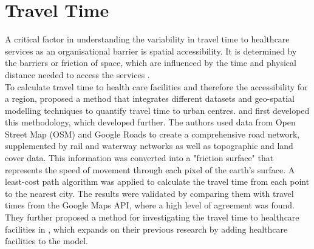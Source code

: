 \documentclass[11pt, a4paper]{report}
\begin{document}
\section{Travel Time}\label{sec:introtraveltime}
A critical factor in understanding the variability in travel time to healthcare services as an organisational barrier is spatial accessibility. It is determined by the barriers or friction of space, which are influenced by the time and physical distance needed to access the services \citep{aday_framework_1974}. \\
%
To calculate travel time to health care facilities and therefore the accessibility for a region, \citet{weiss_global_2018} proposed a method that integrates different datasets and geo-spatial modelling techniques to quantify travel time to urban centres. \citet{nelson_suite_2019} and \citet{european_commission_joint_research_centre_global_2021} first developed this methodology, which \citet{weiss_global_2018} developed further. The authors used data from Open Street Map (OSM) and Google Roads to create a comprehensive road network, supplemented by rail and waterway networks as well as topographic and land cover data. This information was converted into a "friction surface" that represents the speed of movement through each pixel of the earth's surface. A least-cost path algorithm was applied to calculate the travel time from each point to the nearest city. The results were validated by comparing them with travel times from the Google Maps API, where a high level of agreement was found. They further proposed a method for investigating the travel time to healthcare facilities in \citet{weiss_global_2020}, which expands on their previous research by adding healthcare facilities to the model.
\end{document}

